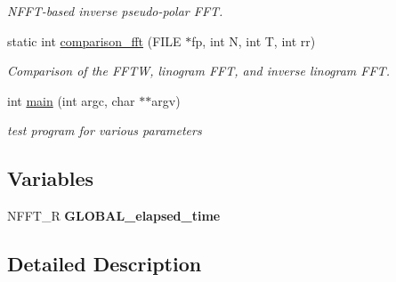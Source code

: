 \begin{DoxyCompactItemize}
\begin{DoxyCompactList}\small\item\em N\-F\-F\-T-\/based inverse pseudo-\/polar F\-F\-T. \end{DoxyCompactList}\item 
\hypertarget{group__applications__polarFFT__linogramm_gaf0cd35cf1d1cce28f76399474878b252}{static int \hyperlink{group__applications__polarFFT__linogramm_gaf0cd35cf1d1cce28f76399474878b252}{comparison\-\_\-fft} (F\-I\-L\-E $\ast$fp, int N, int T, int rr)}\label{group__applications__polarFFT__linogramm_gaf0cd35cf1d1cce28f76399474878b252}

\begin{DoxyCompactList}\small\item\em Comparison of the F\-F\-T\-W, linogram F\-F\-T, and inverse linogram F\-F\-T. \end{DoxyCompactList}\item 
\hypertarget{group__applications__polarFFT__linogramm_ga3c04138a5bfe5d72780bb7e82a18e627}{int \hyperlink{group__applications__polarFFT__linogramm_ga3c04138a5bfe5d72780bb7e82a18e627}{main} (int argc, char $\ast$$\ast$argv)}\label{group__applications__polarFFT__linogramm_ga3c04138a5bfe5d72780bb7e82a18e627}

\begin{DoxyCompactList}\small\item\em test program for various parameters \end{DoxyCompactList}\end{DoxyCompactItemize}
\subsection*{Variables}
\begin{DoxyCompactItemize}
\item 
\hypertarget{group__applications__polarFFT__linogramm_ga520902714d280fb0838f87d81cb5099b}{N\-F\-F\-T\-\_\-\-R {\bfseries G\-L\-O\-B\-A\-L\-\_\-elapsed\-\_\-time}}\label{group__applications__polarFFT__linogramm_ga520902714d280fb0838f87d81cb5099b}

\end{DoxyCompactItemize}


\subsection{Detailed Description}
